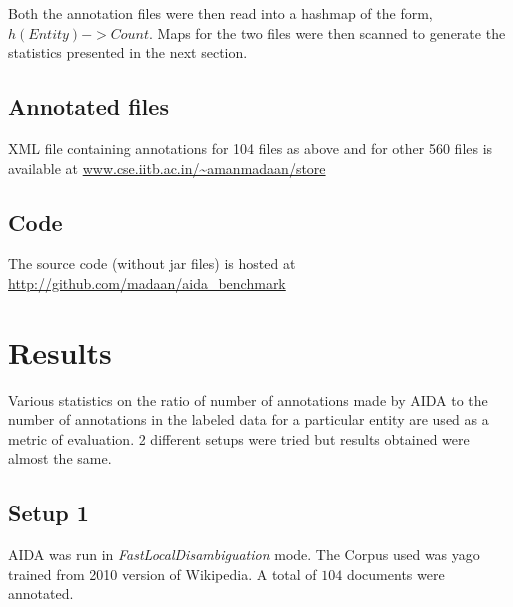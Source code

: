 \documentclass[a4paper,10pt]{article}
\begin{document}
Both the annotation files were then read into a hashmap of the form, $h(Entity) -> Count$. 
Maps for the two files were then scanned to generate the statistics presented in the next section.

\subsection{Annotated files}
XML file containing annotations for 104 files as above and for other 560 files is available at 
\url{www.cse.iitb.ac.in/~amanmadaan/store}

\subsection{Code}
The source code (without jar files) is hosted at \url{http://github.com/madaan/aida_benchmark}
\newpage
\section{Results}
Various statistics on the ratio of number of annotations made by AIDA to the number of annotations in the labeled data for a particular entity
are used as a metric of evaluation. 2 different setups were tried but results obtained were almost the same.
\subsection{Setup 1}
AIDA was run in \emph{FastLocalDisambiguation} mode. 
The Corpus used was yago trained from 2010 version of Wikipedia.
A total of $104$ documents were annotated.
\end{document}
